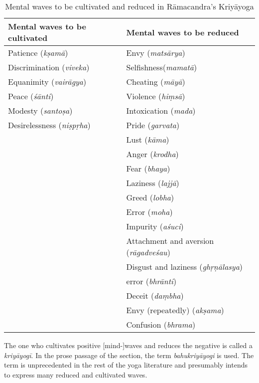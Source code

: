 \begin{table}[h]
    \centering
    \begin{tabularx}{\textwidth}{XX}
        \toprule
        \textbf{Mental waves to be cultivated} & \textbf{Mental waves to be reduced} \\
        \midrule
        Patience (\textit{kṣamā}) & Envy (\textit{matsārya}) \\
        Discrimination (\textit{viveka}) & Selfishness(\textit{mamatā})\\
        Equanimity (\textit{vairāgya}) & Cheating (\textit{māyā})\\
        Peace (\textit{śānti}) & Violence (\textit{hiṃsā})\\
        Modesty (\textit{santoṣa}) & Intoxication (\textit{mada})\\
        Desirelessness (\textit{niṣpṛha}) & Pride (\textit{garvata})\\
        & Lust (\textit{kāma}) \\
        & Anger (\textit{krodha}) \\
        & Fear (\textit{bhaya})\\
        & Laziness (\textit{lajjā})\\
        & Greed (\textit{lobha})\\
        & Error (\textit{moha})\\
        & Impurity (\textit{aśuci})\\
        & Attachment and aversion (\textit{rāgadveśau}) \\
        & Disgust and laziness (\textit{ghṛṇālasya})\\
        & error (\textit{bhrānti})\\
        & Deceit (\textit{daṃbha})\\
        & Envy (repeatedly) (\textit{akṣama})\\
        & Confusion (\textit{bhrama})\\
        \bottomrule
    \end{tabularx}
    \caption{Mental waves to be cultivated and reduced in Rāmacandra's Kriyāyoga}
    \label{tab:waves}
\end{table}

The one who cultivates positive [mind-]waves and reduces the negative is called a \textit{kriyāyogī}. In the prose passage of the section, the term \textit{bahukriyāyogi} is used. The term is unprecedented in the rest of the yoga literature and presumably intends to express many reduced and cultivated waves.
\newpage

